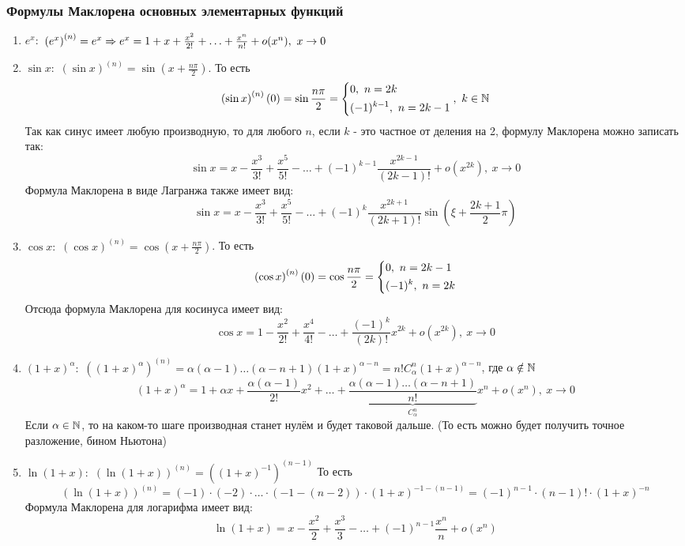 \subsubsection*{Формулы Маклорена основных элементарных функций}

\begin{enumerate}
	\item $e^x:$ $\left(e^x\right)^{(n)} = e^x \Rightarrow e^x = 1 + x + \frac{x^2}{2!} + \ldots + \frac{x^n}{n!} + o(x^n),\ x \to 0$
	
	\item $\sin x:$ $\left(\sin x\right)^{(n)} = \sin(x + \frac{n\pi}{2})$. То есть
	\[
		\left(\sin x\right)^{(n)}(0) = \sin \frac{n\pi}{2} = \left\{\begin{aligned}
			&{0,\ n = 2k}
			\\
			&{(-1)^{k - 1},\ n = 2k - 1}
		\end{aligned}\right.,\ k \in \mathbb{N}
	\]
	Так как синус имеет любую производную, то для любого $n$, если $k$ - это частное от деления на 2, формулу Маклорена можно записать так:
	\[
		\sin x = x - \frac{x^3}{3!} + \frac{x^5}{5!} - \ldots + (-1)^{k - 1} \frac{x^{2k - 1}}{(2k - 1)!} + o(x^{2k}),\ x \to 0
	\]
	Формула Маклорена в виде Лагранжа также имеет вид:
	\[
		\sin x = x - \frac{x^3}{3!} + \frac{x^5}{5!} - \ldots + (-1)^{k} \frac{x^{2k + 1}}{(2k + 1)!} \sin \left(\xi + \frac{2k + 1}{2}\pi\right)
	\]
	
	\item $\cos x:$ $\left(\cos x\right)^{(n)} = \cos (x + \frac{n\pi}{2})$. То есть
	\[
		\left(\cos x\right)^{(n)}(0) = \cos \frac{n\pi}{2} = \left\{\begin{aligned}
			&{0,\ n = 2k - 1}
			\\
			&{(-1)^k,\ n = 2k}
		\end{aligned}\right.
	\]
	Отсюда формула Маклорена для косинуса имеет вид:
	\[
		\cos x = 1 - \frac{x^2}{2!} + \frac{x^4}{4!} - \ldots + \frac{(-1)^k}{(2k)!}x^{2k} + o(x^{2k}),\ x \to 0
	\]
	
	\item $(1 + x)^\alpha:$ $\left((1 + x)^\alpha\right)^{(n)} = \alpha(\alpha - 1)\ldots(\alpha - n + 1)(1 + x)^{\alpha - n} = n! C_{\alpha}^n (1 + x)^{\alpha - n}$, где $\alpha \notin \mathbb{N}$
	\[
		(1 + x)^\alpha = 1 + \alpha x + \frac{\alpha (\alpha - 1)}{2!}x^2 + \ldots + \underbrace{\frac{\alpha (\alpha - 1) \ldots (\alpha - n + 1)}{n!}}_{C_\alpha^n}x^n + o(x^n),\ x \to 0
	\]
	Если $\alpha \in \mathbb{N}$, то на каком-то шаге производная станет нулём и будет таковой дальше. (То есть можно будет получить точное разложение, бином Ньютона)
	
	\item $\ln (1 + x):$ $\left(\ln (1 + x)\right)^{(n)} = \left((1 + x)^{-1}\right)^{(n - 1)}$ То есть \[
		\left(\ln (1 + x)\right)^{(n)}= (-1) \cdot (-2) \cdot \ldots \cdot (-1 - (n - 2)) \cdot (1 + x)^{-1 - (n - 1)} = (-1)^{n - 1} \cdot (n - 1)! \cdot (1 + x)^{-n}
	\]
	Формула Маклорена для логарифма имеет вид:
	\[
		\ln(1 + x) = x - \frac{x^2}{2} + \frac{x^3}{3} - \ldots + (-1)^{n - 1}\frac{x^n}{n} + o(x^n)
	\]
\end{enumerate}

